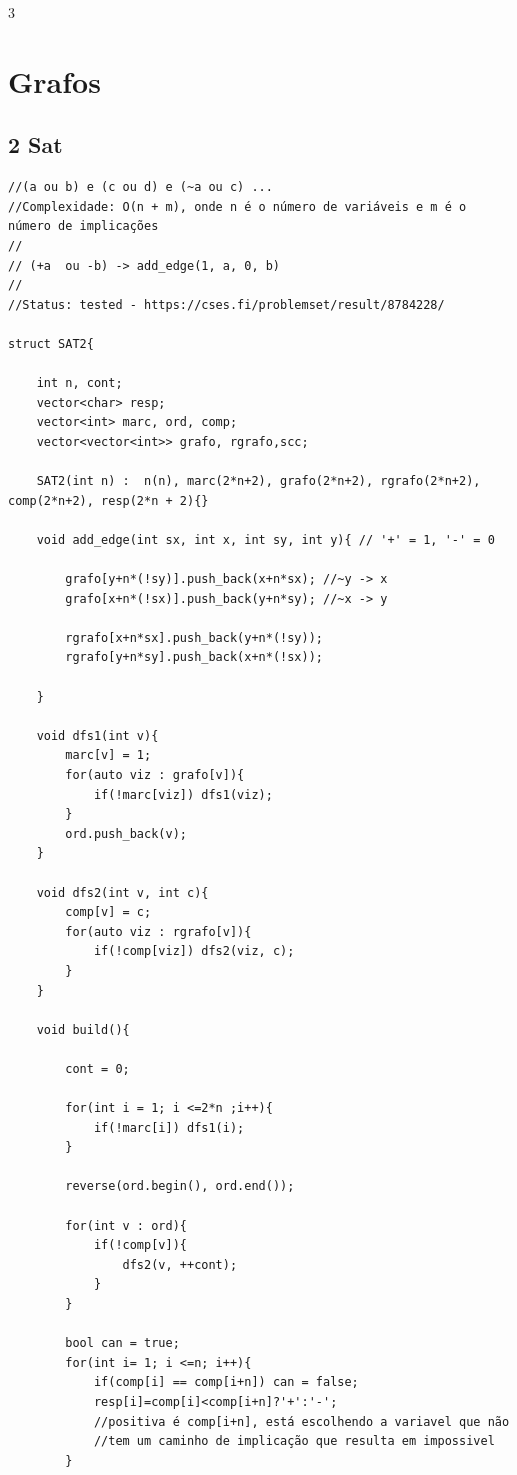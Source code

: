 \documentclass[9pt, a4paper, notitlepage]{extreport}
\begin{document}
\begin{multicols}{3}
%
%

\section{Grafos}

\subsection{2 Sat}
\begin{verbatim}
//(a ou b) e (c ou d) e (~a ou c) ...
//Complexidade: O(n + m), onde n é o número de variáveis e m é o número de implicações
//
// (+a  ou -b) -> add_edge(1, a, 0, b)
//
//Status: tested - https://cses.fi/problemset/result/8784228/

struct SAT2{

    int n, cont;
    vector<char> resp;
    vector<int> marc, ord, comp;
    vector<vector<int>> grafo, rgrafo,scc;

    SAT2(int n) :  n(n), marc(2*n+2), grafo(2*n+2), rgrafo(2*n+2), comp(2*n+2), resp(2*n + 2){}

    void add_edge(int sx, int x, int sy, int y){ // '+' = 1, '-' = 0
        
        grafo[y+n*(!sy)].push_back(x+n*sx); //~y -> x
        grafo[x+n*(!sx)].push_back(y+n*sy); //~x -> y

        rgrafo[x+n*sx].push_back(y+n*(!sy)); 
        rgrafo[y+n*sy].push_back(x+n*(!sx));
        
    }

    void dfs1(int v){   
        marc[v] = 1;
        for(auto viz : grafo[v]){
            if(!marc[viz]) dfs1(viz);
        }
        ord.push_back(v);
    }

    void dfs2(int v, int c){
        comp[v] = c;
        for(auto viz : rgrafo[v]){
            if(!comp[viz]) dfs2(viz, c);
        } 
    }

    void build(){

        cont = 0;

        for(int i = 1; i <=2*n ;i++){
            if(!marc[i]) dfs1(i);
        }

        reverse(ord.begin(), ord.end());

        for(int v : ord){
            if(!comp[v]){
                dfs2(v, ++cont);
            }
        }

        bool can = true;
        for(int i= 1; i <=n; i++){
            if(comp[i] == comp[i+n]) can = false;
            resp[i]=comp[i]<comp[i+n]?'+':'-'; 
            //positiva é comp[i+n], está escolhendo a variavel que não
            //tem um caminho de implicação que resulta em impossivel
        }


\end{verbatim}
\end{multicols}
\end{document}
